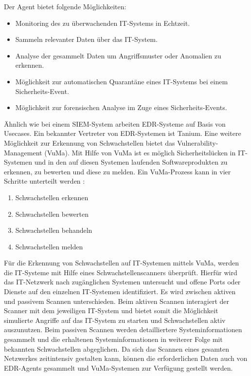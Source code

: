 \bigbreak
Der Agent bietet folgende Möglichkeiten:
\begin{itemize}
    \item Monitoring des zu überwachenden IT-Systems in Echtzeit.
    \item Sammeln relevanter Daten über das IT-System.
    \item Analyse der gesammelt Daten um Angriffsmuster oder Anomalien zu erkennen.
    \item Möglichkeit zur automatischen Quarantäne eines IT-Systems bei einem Sicherheits-Event.
    \item Möglichkeit zur forensischen Analyse im Zuge eines Sicherheits-Events.
\end{itemize}
\bigbreak
Ähnlich wie bei einem SIEM-System arbeiten EDR-Systeme auf Basis von Usecases. Ein bekannter Vertreter von EDR-Systemen ist Tanium.
\bigbreak
Eine weitere Möglichkeit zur Erkennung von Schwachstellen bietet das \glqq{}Vulnerability-Management\grqq{} (VuMa). Mit Hilfe von VuMa ist es möglich Sicherheitslücken in IT-Systemen und in den auf diesen Systemen laufenden Softwareprodukten zu erkennen, zu bewerten und diese zu melden. 
\bigbreak
Ein VuMa-Prozess kann in vier Schritte unterteilt werden \autocite{rapid7}:
\begin{enumerate}
    \item Schwachstellen erkennen
    \item Schwachstellen bewerten
    \item Schwachstellen behandeln
    \item Schwachstellen melden
\end{enumerate}
\bigbreak
Für die Erkennung von Schwachstellen auf IT-Systemen mittels VuMa, werden die IT-Systeme mit Hilfe eines Schwachstellenscanners überprüft. Hierfür wird das IT-Netzwerk nach zugänglichen Systemen untersucht und offene Ports oder Dienste auf den einzelnen IT-Systemen identifiziert. Es wird zwischen aktiven und passivem Scannen unterschieden. Beim aktiven Scannen interagiert der Scanner mit dem jeweiligen IT-System und bietet somit die Möglichkeit simulierte Angriffe auf das IT-System zu starten und Schwachstellen aktiv auszunutzen. Beim passiven Scannen werden detailliertere Systeminformationen gesammelt und die erhaltenen Systeminformationen in weiterer Folge mit bekannten Schwachstellen abgeglichen. Da sich das Scannen eines gesamten Netzwerkes zeitintensiv gestalten kann, können die erforderlichen Daten auch von EDR-Agents gesammelt und VuMa-Systemen zur Verfügung gestellt werden. \autocite{HaberMoreyJ2018AAV:}
